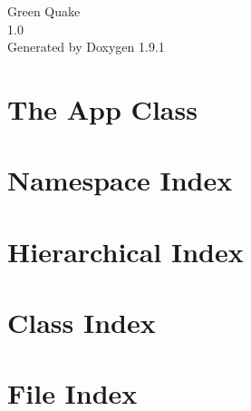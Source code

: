 \let\mypdfximage\pdfximage\def\pdfximage{\immediate\mypdfximage}\documentclass[twoside]{book}
\newcommand{\+}{\discretionary{\mbox{\scriptsize$\hookleftarrow$}}{}{}}
\newcommand{\clearemptydoublepage}{%
  \newpage{\pagestyle{empty}\cleardoublepage}%
}
\begin{document}
\raggedbottom

\hypersetup{pageanchor=false,
             bookmarksnumbered=true,
             pdfencoding=unicode
            }
\begin{titlepage}
\vspace*{7cm}
\begin{center}%
{\Large Green Quake \\[1ex]\large 1.\+0 }\\
\vspace*{1cm}
{\large Generated by Doxygen 1.9.1}\\
\end{center}
\end{titlepage}
\clearemptydoublepage
{}
\tableofcontents
\clearemptydoublepage
{}
\hypersetup{pageanchor=true}

\chapter{The App Class}
\label{index}\hypertarget{index}{}
\chapter{Namespace Index}

\chapter{Hierarchical Index}

\chapter{Class Index}

\chapter{File Index}

\end{document}
